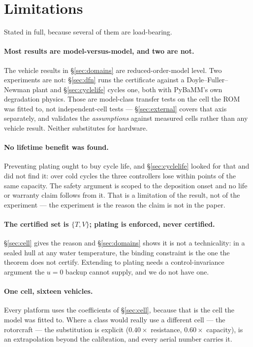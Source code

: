 \documentclass[11pt,letterpaper]{article}
\theoremstyle{definition}
\theoremstyle{remark}
\begin{document}
\section{Limitations}\label{sec:limits}

Stated in full, because several of them are load-bearing.

\paragraph{Most results are model-versus-model, and two are not.} The vehicle results in
\S\ref{sec:domains} are reduced-order-model level. Two experiments are not:
\S\ref{sec:dfn} runs the certificate against a Doyle--Fuller--Newman plant and \S\ref{sec:cyclelife}
cycles one, both with PyBaMM's own degradation physics. Those are model-class transfer tests on
the cell the ROM was fitted to, not independent-cell tests --- \S\ref{sec:external} covers that
axis separately, and validates the \emph{assumptions} against measured cells rather than any
vehicle result. Neither substitutes for hardware.

\paragraph{No lifetime benefit was found.} Preventing plating ought to buy cycle life, and
\S\ref{sec:cyclelife} looked for that and did not find it: over \clCycles{} cold cycles the three
controllers lose within \clSpread{} points of the same capacity. The safety argument is scoped to
the deposition onset and no life or warranty claim follows from it. That is a limitation of the
result, not of the experiment --- the experiment is the reason the claim is not in the paper.

\paragraph{The certified set is $\{T, V\}$; plating is enforced, never certified.}
\S\ref{sec:cell} gives the reason and \S\ref{sec:domains} shows it is not a technicality: in a
sealed hull at any water temperature, the binding constraint is the one the theorem does not
certify. Extending to plating needs a control-invariance argument the $u=0$ backup cannot
supply, and we do not have one.

\paragraph{One cell, sixteen vehicles.} Every platform uses the coefficients of
\S\ref{sec:cell}, because that is the cell the model was fitted to. Where a class would really
use a different cell --- the rotorcraft --- the substitution is explicit ($0.40\times$
resistance, $0.60\times$ capacity), is an extrapolation beyond the calibration, and every aerial
number carries it.
\end{document}
